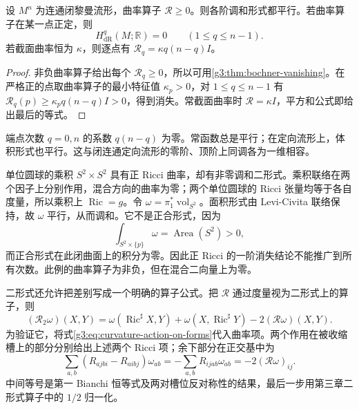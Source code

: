 \begin{corollary}\label{g3:cor:nonnegative-curvature-operator-forms}
	设 \(M^n\) 为连通闭黎曼流形，曲率算子 \(\mathcal R\ge0\)。则各阶调和形式都平行。若曲率算子在某一点正定，则
	\[
		H_{\mathrm{dR}}^q(M;\mathbb R)=0\qquad(1\le q\le n-1).
	\]
	若截面曲率恒为 \(\kappa\)，则逐点有
	\(\mathcal R_q=\kappa q(n-q)I\)。
\end{corollary}
\begin{proof}
	非负曲率算子给出每个 \(\mathcal R_q\ge0\)，所以可用\cref{g3:thm:bochner-vanishing}。在严格正的点取曲率算子的最小特征值 \(\kappa_p>0\)，对 \(1\le q\le n-1\) 有
	\(\mathcal R_q(p)\ge\kappa_pq(n-q)I>0\)，得到消失。常截面曲率时
	\(\mathcal R=\kappa I\)，平方和公式即给出最后的等式。
\end{proof}

端点次数 \(q=0,n\) 的系数 \(q(n-q)\) 为零。常函数总是平行；在定向流形上，体积形式也平行。这与闭连通定向流形的零阶、顶阶上同调各为一维相容。

\begin{example}\label{g3:exm:positive-ricci-higher-form}
	单位圆球的乘积 \(S^2\times S^2\) 具有正 Ricci 曲率，却有非零调和二形式。乘积联络在两个因子上分别作用，混合方向的曲率为零；两个单位圆球的 Ricci 张量均等于各自度量，所以乘积上
	\(\operatorname{Ric}=g\)。令 \(\omega=\pi_1^*\operatorname{vol}_{S^2}\)。面积形式由 Levi-Civita 联络保持，故 \(\omega\) 平行，从而调和。它不是正合形式，因为
	\[
		\int_{S^2\times\{p\}}\omega=\operatorname{Area}(S^2)>0,
	\]
	而正合形式在此闭曲面上的积分为零。因此正 Ricci 的一阶消失结论不能推广到所有次数。此例的曲率算子为非负，但在混合二向量上为零。
\end{example}

二形式还允许把差别写成一个明确的算子公式。把 \(\mathcal R\) 通过度量视为二形式上的算子，则
\begin{equation}\label{g3:eq:two-form-weitzenbock-curvature}
	(\mathcal R_2\omega)(X,Y)
	=\omega(\operatorname{Ric}^{\sharp}X,Y)
	 +\omega(X,\operatorname{Ric}^{\sharp}Y)
	 -2(\mathcal R\omega)(X,Y).
\end{equation}
为验证它，将式\eqref{g3:eq:curvature-action-on-forms}代入曲率项。两个作用在被收缩槽上的部分分别给出上述两个 Ricci 项；余下部分在正交基中为
\[
	\sum_{a,b}(R_{ajbi}-R_{aibj})\omega_{ab}
	=-\sum_{a,b}R_{ijab}\omega_{ab}
	=-2(\mathcal R\omega)_{ij}.
\]
中间等号是第一 Bianchi 恒等式及两对槽位反对称性的结果，最后一步用第三章二形式算子中的 \(1/2\) 归一化。

